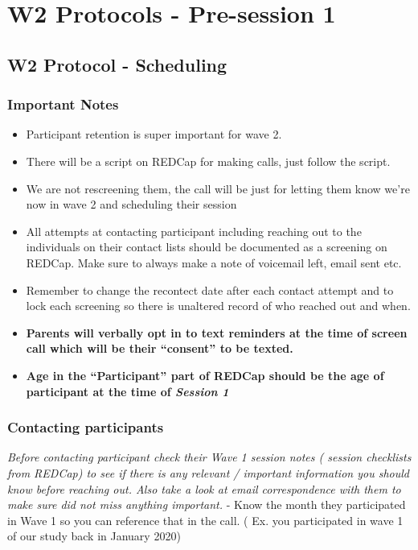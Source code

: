\documentclass[
]{book}
\providecommand{\tightlist}{%
  \setlength{\itemsep}{0pt}\setlength{\parskip}{0pt}}
\begin{document}
\hypertarget{w2-protocols---pre-session-1}{%
\section{W2 Protocols - Pre-session 1}\label{w2-protocols---pre-session-1}}

\hypertarget{w2-protocol---scheduling}{%
\subsection{W2 Protocol - Scheduling}\label{w2-protocol---scheduling}}

\hypertarget{important-notes}{%
\subsubsection{Important Notes}\label{important-notes}}

\begin{itemize}
\tightlist
\item
  Participant retention is super important for wave 2.
\item
  There will be a script on REDCap for making calls, just follow the script.
\item
  We are not rescreening them, the call will be just for letting them know we're now in wave 2 and scheduling their session
\item
  All attempts at contacting participant including reaching out to the individuals on their contact lists should be documented as a screening on REDCap. Make sure to always make a note of voicemail left, email sent etc.
\item
  Remember to change the recontect date after each contact attempt and to lock each screening so there is unaltered record of who reached out and when.
\item
  \textbf{Parents will verbally opt in to text reminders at the time of screen call which will be their ``consent'' to be texted.}
\item
  \textbf{Age in the ``Participant'' part of REDCap should be the age of participant at the time of \emph{Session 1} }
\end{itemize}

\hypertarget{contacting-participants}{%
\subsubsection{Contacting participants}\label{contacting-participants}}

\emph{Before contacting participant check their Wave 1 session notes ( session checklists from REDCap) to see if there is any relevant / important information you should know before reaching out. Also take a look at email correspondence with them to make sure did not miss anything important.}
- Know the month they participated in Wave 1 so you can reference that in the call. ( Ex. you participated in wave 1 of our study back in January 2020)~
\end{document}
